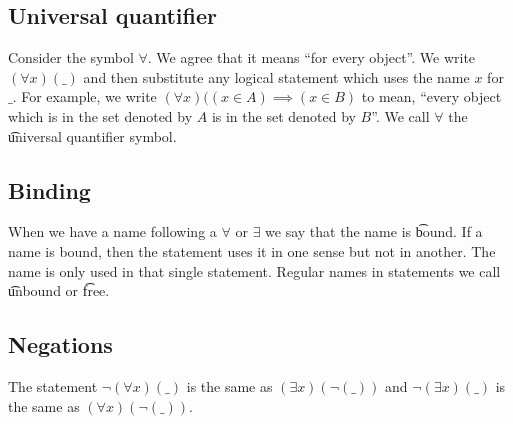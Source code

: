 \subsection*{Universal quantifier}

Consider the symbol $\forall$.
We agree that it means ``for every object''.
We write $(\forall x)(\_)$ and then substitute any logical statement which uses the name $x$ for $\_$.
For example, we write $(\forall x)((x \in A)\implies(x \in B)$ to mean, ``every object which is in the set denoted by $A$ is in the set denoted by $B$''.
We call $\forall$ the \t{universal quantifier} symbol.

\subsection*{Binding}

When we have a name following a $\forall$ or $\exists $ we say that the name is \t{bound}.
If a name is bound, then the statement uses it in one sense but not in another.
The name is only used in that single statement.
Regular names in statements we call \t{unbound} or \t{free}.

\subsection*{Negations}

The statement $\neg(\forall x)(\_)$ is the same as $(\exists x)(\neg(\_))$ and $\neg(\exists x)(\_)$ is the same as $(\forall x)(\neg(\_))$.
